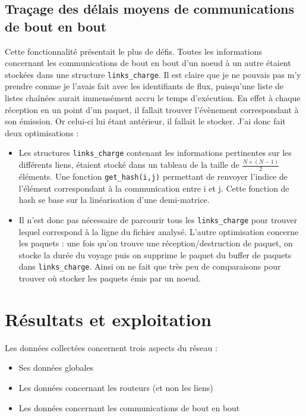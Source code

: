 \documentclass[
10pt, %
a4paper, %
oneside, %
headinclude,footinclude, %
BCOR5mm, %
]{scrartcl}
\begin{document}
\subsection{Traçage des délais moyens de communications de bout en bout}
Cette fonctionnalité présentait le plus de défis. Toutes les informations concernant les communications de bout en bout d'un noeud à un autre étaient stockées dans une structure \texttt{links\_charge}. Il est claire que je ne pouvais pas m'y prendre comme je l'avais fait avec les identifiants de flux, puisqu'une liste de listes chaînées aurait immensément accru le temps d'exécution. En effet à chaque réception en un point d'un paquet, il fallait trouver l'évènement correspondant à son émission. Or celui-ci lui étant antérieur, il fallait le stocker. J'ai donc fait deux optimisations :
\begin{itemize}
	\item{Les structures \texttt{links\_charge} contenant les informations pertinentes sur les différents liens, étaient stocké dans un tableau de la taille de $ \frac{  N \times (N-1) }{2} $ } éléments. Une fonction \texttt{get\_hash(i,j)} permettant de renvoyer l'indice de l'élément correspondant à la communication entre i et j. Cette fonction de hash se base sur la linéarisation d'une demi-matrice.
	\item{Il n'est donc pas nécessaire de parcourir tous les \texttt{links\_charge} pour trouver lequel correspond à la ligne du fichier analysé. L'autre optimisation concerne les paquets : une fois qu'on trouve une réception/destruction de paquet, on stocke la durée du voyage puis on supprime le paquet du buffer de paquets dans \texttt{links\_charge}. Ainsi on ne fait que très peu de comparaisons pour trouver où stocker les paquets émis par un noeud.}

\end{itemize}

\newpage
\section{Résultats et exploitation}
Les données collectées concernent trois aspects du réseau :
\begin{itemize}
\item{Ses données globales}
\item{Les données concernant les routeurs (et non les liens)}
\item{Les données concernant les communications de bout en bout}
\end{itemize}
\end{document}
